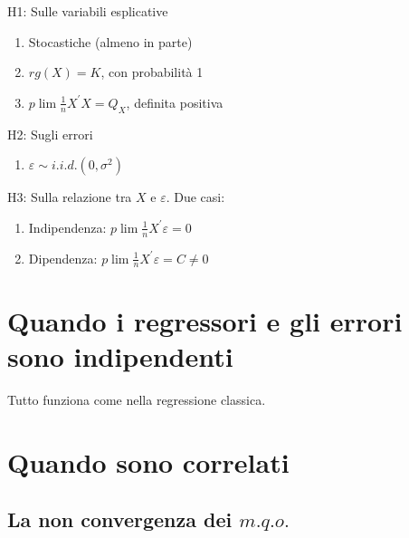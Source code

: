 \documentclass[a4paper]{report}
\newcounter{def}
\theoremstyle{remark}
\begin{document}
\bigskip \noindent H1: Sulle variabili esplicative

\begin{enumerate}
\item Stocastiche (almeno in parte)

\item $rg(X)=K$, con probabilit\`{a} 1

\item $p\lim \frac{1}{n}X^{\prime }X=Q_{X}$, definita positiva
\end{enumerate}

\bigskip \noindent H2: Sugli errori

\begin{enumerate}
\item[ ] $\varepsilon \sim i.i.d.(0,\sigma ^{2})$
\end{enumerate}

\bigskip \noindent H3: Sulla relazione tra $X$ e $\varepsilon $. Due casi:

\begin{enumerate}
\item Indipendenza: $p\lim \frac{1}{n}X^{\prime }\varepsilon =0$

\item Dipendenza: $p\lim \frac{1}{n}X^{\prime }\varepsilon =C\neq 0$
\end{enumerate}

\section{Quando i regressori e gli errori sono indipendenti}

Tutto funziona come nella regressione classica.

\section{Quando sono correlati}

\subsection{{La non convergenza dei }${m.q.o.}$}
\end{document}
